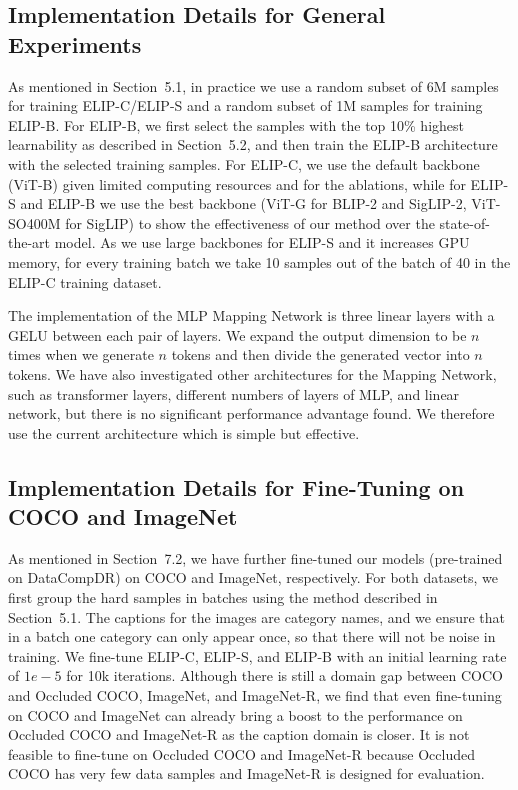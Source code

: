 \subsection{Implementation Details for General Experiments}
\label{sec:sup_implement_detail_general}

As mentioned in Section~5.1, in practice we use a random subset of 6M samples for training ELIP-C/ELIP-S and a random subset of 1M samples for training ELIP-B. For ELIP-B, we first select the samples with the top 10\% highest learnability as described in Section~5.2, and then train the ELIP-B architecture with the selected training samples. For ELIP-C, we use the default backbone (ViT-B) given limited computing resources and for the ablations, while for ELIP-S and ELIP-B we use the best backbone (ViT-G for BLIP-2 and SigLIP-2, ViT-SO400M for SigLIP) to show the effectiveness of our method over the state-of-the-art model. 
As we use large backbones for ELIP-S and it increases GPU memory, for every training batch we take 10 samples out of the batch of 40 in the ELIP-C training dataset.

The implementation of the MLP Mapping Network is three linear layers with a GELU between each pair of layers. We expand the output dimension to be $n$ times when we generate $n$ tokens and then divide the generated vector into $n$ tokens. 
We have also investigated other architectures for the Mapping Network, such as transformer layers, different numbers of layers of MLP, and linear network, but there is no significant performance advantage found. We therefore use the current architecture which is simple but effective.

\subsection{Implementation Details for Fine-Tuning on COCO and ImageNet}
\label{sec:sup_implement_detail_finetune}

As mentioned in Section~7.2, we have further fine-tuned our models (pre-trained on DataCompDR) on COCO and ImageNet, respectively. 
For both datasets, we first group the hard samples in batches using the method described in Section~5.1. 
The captions for the images are category names, 
and we ensure that in a batch one category can only appear once, 
so that there will not be noise in training. 
We fine-tune ELIP-C, ELIP-S, and ELIP-B with an initial learning rate of $1e-5$ for 10k iterations. 
Although there is still a domain gap between COCO and Occluded COCO, ImageNet, and ImageNet-R, we find that even fine-tuning on COCO and ImageNet can already bring a boost to the performance on Occluded COCO and ImageNet-R as the caption domain is closer. It is not feasible to fine-tune on Occluded COCO and ImageNet-R because Occluded COCO has very few data samples and ImageNet-R is designed for evaluation.



